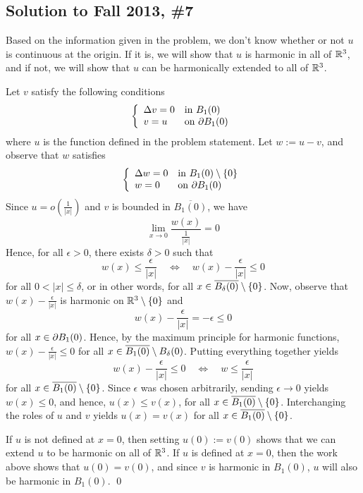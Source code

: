 \subsection*{Solution to Fall 2013, \#7}
\label{F13Q7}

Based on the information given in the problem, we don't know whether or not $u$ is continuous at the origin. If it is, we will show that $u$ is harmonic in all of $\mathbb{R}^3$, and if not, we will show that $u$ can be harmonically extended to all of $\mathbb{R}^3$.

Let $v$ satisfy the following conditions
$$ \left\{
\begin{array}{ll}
\Delta v = 0 & \text{in} \,\, B_1(0) \\
v = u & \text{on} \,\, \partial B_1(0)
\end{array} \right. $$
where $u$ is the function defined in the problem statement. Let $w := u-v$, and observe that $w$ satisfies
$$ \left\{
\begin{array}{ll}
\Delta w = 0 & \text{in} \,\, B_1(0) \setminus \{0\} \\
w = 0 & \text{on} \,\, \partial B_1(0)
\end{array} \right. $$
Since $u = o\left(\frac{1}{|x|}\right)$ and $v$ is bounded in $\overline{B_1(0)}$, we have
$$ \lim_{x \to 0} \frac{w(x)}{\frac{1}{|x|}} = 0 $$
Hence, for all $\epsilon > 0$, there exists $\delta > 0$ such that
$$ w(x) \leq \frac{\epsilon}{|x|} \quad \Leftrightarrow \quad  w(x) - \frac{\epsilon}{|x|} \leq 0 $$
for all $0 < |x| \leq \delta$, or in other words, for all $x \in \overline{B_{\delta}(0)} \setminus \{0\}$. Now, observe that $w(x) - \frac{\epsilon}{|x|}$ is harmonic on $\mathbb{R}^3 \setminus \{0\}$ and
$$w(x) - \frac{\epsilon}{|x|} = -\epsilon \leq 0$$
for all $x \in \partial B_1(0)$. Hence, by the maximum principle for harmonic functions, $w(x) - \frac{\epsilon}{|x|} \leq 0$ for all $x \in \overline{B_1(0)} \setminus B_{\delta}(0)$. Putting everything together yields
$$ w(x) - \frac{\epsilon}{|x|} \leq 0 \quad \Leftrightarrow \quad w \leq \frac{\epsilon}{|x|} $$
for all $x \in \overline{B_1(0)} \setminus \{0\}$. Since $\epsilon$ was chosen arbitrarily, sending $\epsilon \to 0$ yields $w(x) \leq 0$, and hence, $u(x) \leq v(x)$, for all $x \in \overline{B_1(0)} \setminus \{0\}$. Interchanging the roles of $u$ and $v$ yields $u(x) = v(x)$ for all $x \in \overline{B_1(0)} \setminus \{0\}$.

If $u$ is not defined at $x=0$, then setting $u(0) := v(0)$ shows that we can extend $u$ to be harmonic on all of $\mathbb{R}^3$. If $u$ is defined at $x=0$, then the work above shows that $u(0) = v(0)$, and since $v$ is harmonic in $B_1(0)$, $u$ will also be harmonic in $B_1(0)$.  \hfill \qed



